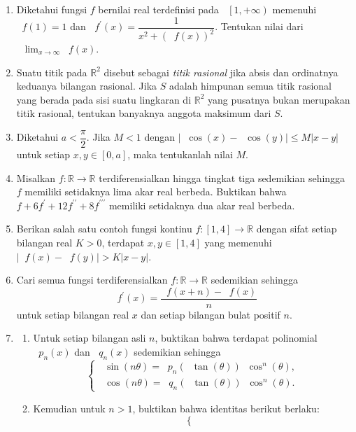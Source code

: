 \documentclass[12pt]{article}
\newcommand*\lkrb[1]{\mathop{}\!\left[{#1}\right)}
\newcommand*\func[2]{\mathop{}\!{#1}{\left({#2}\right)}}
\newcommand*\ds[1]{\mathop{}\!\displaystyle{{#1}}}
\begin{document}
\begin{enumerate}[leftmargin=*]
		\item Diketahui fungsi $ f $ bernilai real terdefinisi pada $ \lkrb{1, +\infty} $ memenuhi $ \func{f}{1} = 1 $ dan $ \func{f^{\prime}}{x} = \dfrac{1}{x^{2} + \left(\func{f}{x}\right)^{2}} $. Tentukan nilai dari $ \ds{\lim_{x \to \infty}{\func{f}{x}}} $.
		\item Suatu titik pada $ \mathbb{R}^{2} $ disebut sebagai \textit{titik rasional} jika absis dan ordinatnya keduanya bilangan rasional. Jika $ S $ adalah himpunan semua titik rasional yang berada pada sisi suatu lingkaran di $ \mathbb{R}^{2} $ yang pusatnya bukan merupakan titik rasional, tentukan banyaknya anggota maksimum dari $ S $.
		\item Diketahui $ a < \dfrac{\pi}{2} $. Jika $ M < 1 $ dengan $ \left|\func{\cos}{x} - \func{\cos}{y}\right| \leq M\left|x - y\right| $ untuk setiap $ x, y \in \left[0, a\right] $, maka tentukanlah nilai $ M $.
		\item Misalkan $ f : \mathbb{R} \to \mathbb{R} $ terdiferensialkan hingga tingkat tiga sedemikian sehingga $ f $ memiliki setidaknya lima akar real berbeda. Buktikan bahwa $ f + 6f^{\prime} + 12f^{\prime\prime} + 8f^{\prime\prime\prime} $ memiliki setidaknya dua akar real berbeda.
		\item Berikan salah satu contoh fungsi kontinu $ f : \left[1, 4\right] \to \mathbb{R} $ dengan sifat setiap bilangan real $ K > 0 $, terdapat $ x, y \in \left[1, 4\right] $ yang memenuhi $ \left|\func{f}{x} - \func{f}{y}\right| > K\left|x - y\right| $.
		\item Cari semua fungsi terdiferensialkan $ f : \mathbb{R} \to \mathbb{R} $ sedemikian sehingga
		\[ \func{f^{\prime}}{x} = \frac{\func{f}{x + n} - \func{f}{x}}{n} \]
		untuk setiap bilangan real $ x $ dan setiap bilangan bulat positif $ n $.
		\item
		\begin{enumerate}
			\item Untuk setiap bilangan asli $ n $, buktikan bahwa terdapat polinomial $ \func{p_{n}}{x} $ dan $ \func{q_{n}}{x} $ sedemikian sehingga
			\[
				\begin{cases}
					\func{\sin}{n\theta} = \func{p_{n}}{\func{\tan}{\theta}}\func{\cos^{n}}{\theta}, \\
					\func{\cos}{n\theta} = \func{q_{n}}{\func{\tan}{\theta}}\func{\cos^{n}}{\theta}.
				\end{cases}
			\]
			\item Kemudian untuk $ n > 1 $, buktikan bahwa identitas berikut berlaku:
			\[
				\begin{cases}

\end{cases}\]
\end{enumerate}
\end{enumerate}
\end{document}
